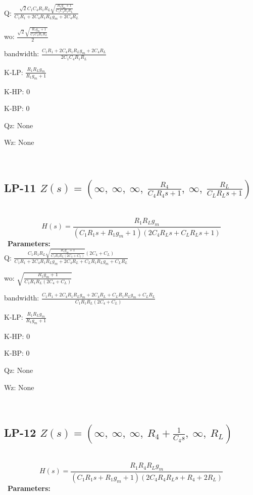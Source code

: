 \documentclass{article}
\begin{document}
Q: $\frac{\sqrt{2} C_{1} C_{4} R_{1} R_{L} \sqrt{\frac{R_{1} g_{m} + 1}{C_{1} C_{4} R_{1} R_{L}}}}{C_{1} R_{1} + 2 C_{4} R_{1} R_{L} g_{m} + 2 C_{4} R_{L}}$\ 

wo: $\frac{\sqrt{2} \sqrt{\frac{R_{1} g_{m} + 1}{C_{1} C_{4} R_{1} R_{L}}}}{2}$\ 

bandwidth: $\frac{C_{1} R_{1} + 2 C_{4} R_{1} R_{L} g_{m} + 2 C_{4} R_{L}}{2 C_{1} C_{4} R_{1} R_{L}}$\ 

K-LP: $\frac{R_{1} R_{L} g_{m}}{R_{1} g_{m} + 1}$\ 

K-HP: $0$\ 

K-BP: $0$\ 

Qz: $\text{None}$\ 

Wz: $\text{None}$\ 

\ 

\subsection{LP-11 $Z(s) = \left( \infty, \  \infty, \  \infty, \  \frac{R_{4}}{C_{4} R_{4} s + 1}, \  \infty, \  \frac{R_{L}}{C_{L} R_{L} s + 1}\right)$ } \ 
\textbf{\[H(s) = \frac{R_{1} R_{L} g_{m}}{\left(C_{1} R_{1} s + R_{1} g_{m} + 1\right) \left(2 C_{4} R_{L} s + C_{L} R_{L} s + 1\right)}\] } \ 
\textbf{Parameters:}\\ 

Q: $\frac{C_{1} R_{1} R_{L} \sqrt{\frac{R_{1} g_{m} + 1}{C_{1} R_{1} R_{L} \left(2 C_{4} + C_{L}\right)}} \left(2 C_{4} + C_{L}\right)}{C_{1} R_{1} + 2 C_{4} R_{1} R_{L} g_{m} + 2 C_{4} R_{L} + C_{L} R_{1} R_{L} g_{m} + C_{L} R_{L}}$\ 

wo: $\sqrt{\frac{R_{1} g_{m} + 1}{C_{1} R_{1} R_{L} \left(2 C_{4} + C_{L}\right)}}$\ 

bandwidth: $\frac{C_{1} R_{1} + 2 C_{4} R_{1} R_{L} g_{m} + 2 C_{4} R_{L} + C_{L} R_{1} R_{L} g_{m} + C_{L} R_{L}}{C_{1} R_{1} R_{L} \left(2 C_{4} + C_{L}\right)}$\ 

K-LP: $\frac{R_{1} R_{L} g_{m}}{R_{1} g_{m} + 1}$\ 

K-HP: $0$\ 

K-BP: $0$\ 

Qz: $\text{None}$\ 

Wz: $\text{None}$\ 

\ 

\subsection{LP-12 $Z(s) = \left( \infty, \  \infty, \  \infty, \  R_{4} + \frac{1}{C_{4} s}, \  \infty, \  R_{L}\right)$ } \ 
\textbf{\[H(s) = \frac{R_{1} R_{4} R_{L} g_{m}}{\left(C_{1} R_{1} s + R_{1} g_{m} + 1\right) \left(2 C_{4} R_{4} R_{L} s + R_{4} + 2 R_{L}\right)}\] } \ 
\textbf{Parameters:}\\ 
\end{document}
